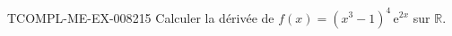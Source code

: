 \begin{exercice}{TCOMPL-ME-EX-008}{2}{15}
Calculer la dérivée de $f(x) = (x^3 - 1)^4 \, \mathrm{e}^{2x}$ sur $\mathbb{R}$.

\end{exercice}
